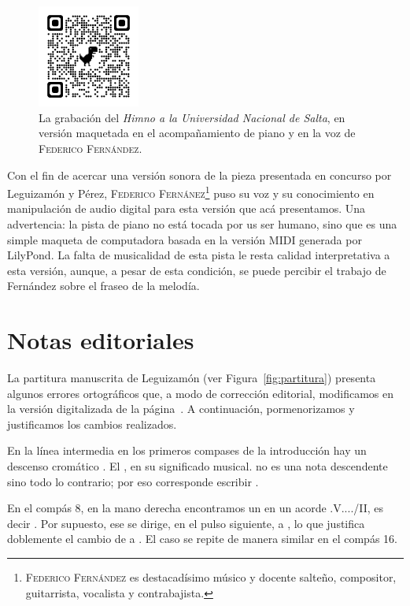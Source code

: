 \begin{figure}[H]
\centering
\includegraphics[width=0.3\textwidth]{img/qrcode-himno-fernandez}
\caption[La grabación del \emph{Himno}.]{La grabación del \emph{Himno a la Universidad Nacional de Salta}, en versión maquetada en el acompañamiento de piano y en la voz de \textsc{Federico Fernández}.}
\label{fig:grabacion}
\end{figure}

Con el fin de acercar una versión sonora de la pieza presentada en concurso por Leguizamón y Pérez, \textsc{Federico Fernánez}\footnote{\textsc{Federico Fernández} es destacadísimo músico y docente salteño, compositor, guitarrista, vocalista y contrabajista.} puso su voz y su conocimiento en manipulación de audio digital para esta versión que acá presentamos. Una advertencia: la pista de piano no está tocada por us ser humano, sino que es una simple maqueta de computadora basada en la versión MIDI generada por LilyPond. La falta de musicalidad de esta pista le resta calidad interpretativa a esta versión, aunque, a pesar de esta condición, se puede percibir el trabajo de Fernández sobre el fraseo de la melodía.


\section{Notas editoriales}
\label{sec:notas-editoriales}

La partitura manuscrita de Leguizamón (ver Figura~\ref{fig:partitura}) presenta algunos errores ortográficos que, a modo de corrección editorial, modificamos en la versión digitalizada de la página~\pageref{partitura-digitalizada}. A continuación, pormenorizamos y justificamos los cambios realizados.

En la línea intermedia en los primeros compases de la introducción hay un descenso cromático \hbox{.} El \hbox{,} en su significado musical. no es una nota descendente sino todo lo contrario; por eso corresponde escribir \hbox{.}

En el compás 8, en la mano derecha encontramos un  en un acorde \acorde.V..../II, es decir \hbox{.} Por supuesto, ese  se dirige, en el pulso siguiente, a  \hbox{,} lo que justifica doblemente el cambio de  a . El caso se repite de manera similar en el compás 16.


